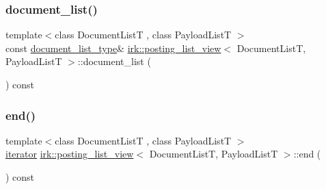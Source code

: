 \mbox{\label{classirk_1_1posting__list__view_a786901ec3fe9ccf2ce0b9aafd90dd289}} 
\subsubsection{\texorpdfstring{document\+\_\+list()}{document\_list()}}
{\footnotesize\ttfamily template$<$class Document\+ListT , class Payload\+ListT $>$ \\
const \mbox{\hyperlink{classirk_1_1posting__list__view_ae024545dbbb464926a2024d956b7b7af}{document\+\_\+list\+\_\+type}}\& \mbox{\hyperlink{classirk_1_1posting__list__view}{irk\+::posting\+\_\+list\+\_\+view}}$<$ Document\+ListT, Payload\+ListT $>$\+::document\+\_\+list (\begin{DoxyParamCaption}{ }\end{DoxyParamCaption}) const\hspace{0.3cm}{\ttfamily [inline]}}

\mbox{\label{classirk_1_1posting__list__view_a57999e9c9b9347a86b242147fbd930b7}} 
\subsubsection{\texorpdfstring{end()}{end()}}
{\footnotesize\ttfamily template$<$class Document\+ListT , class Payload\+ListT $>$ \\
\mbox{\hyperlink{classirk_1_1posting__list__view_1_1iterator}{iterator}} \mbox{\hyperlink{classirk_1_1posting__list__view}{irk\+::posting\+\_\+list\+\_\+view}}$<$ Document\+ListT, Payload\+ListT $>$\+::end (\begin{DoxyParamCaption}{ }\end{DoxyParamCaption}) const\hspace{0.3cm}{\ttfamily [inline]}}

\mbox{\label{classirk_1_1posting__list__view_a2078e1a0c33d66cb0aa609fb8937911c}} 
